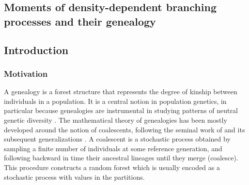 \begin{refsegment}
\chapter[Moments of density-dependent branching processes and their genealogy]{Moments of density-dependent branching processes and their genealogy}\label{chp3_singletype}




\section{Introduction}

\subsection{Motivation}

A genealogy is a forest structure that represents the degree of kinship
between individuals in a population. It is a central notion in population
genetics, in particular because genealogies are instrumental in studying
patterns of neutral genetic diversity \citep{wakeley_coalescent_2009,
tellier2014coalescence}. The mathematical theory of genealogies has been
mostly developed around the notion of coalescents, following the
seminal work of \citet{Kingman:1982aa} and its
subsequent generalizations \citep{Pitman:1999aa,
sagitov1999general, donnelly1999particle, schweinsberg2001coalescents}. 
A coalescent is a stochastic process obtained by sampling a finite number
of individuals at some reference generation, and following backward in
time their ancestral lineages until they merge (coalesce). This procedure
constructs a random forest which is usually encoded as a stochastic process with
values in the partitions.


\end{refsegment}
